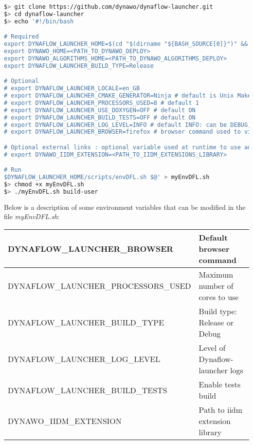 \documentclass[a4paper, 12pt]{report}
\begin{document}
\begin{lstlisting}[language=bash]
$> git clone https://github.com/dynawo/dynaflow-launcher.git
$> cd dynaflow-launcher
$> echo '#!/bin/bash

# Required
export DYNAFLOW_LAUNCHER_HOME=$(cd "$(dirname "${BASH_SOURCE[0]}")" && pwd)
export DYNAWO_HOME=<PATH_TO_DYNAWO_DEPLOY>
export DYNAWO_ALGORITHMS_HOME=<PATH_TO_DYNAWO_ALGORITHMS_DEPLOY>
export DYNAFLOW_LAUNCHER_BUILD_TYPE=Release

# Optional
# export DYNAFLOW_LAUNCHER_LOCALE=en_GB
# export DYNAFLOW_LAUNCHER_CMAKE_GENERATOR=Ninja # default is Unix Makefiles
# export DYNAFLOW_LAUNCHER_PROCESSORS_USED=8 # default 1
# export DYNAFLOW_LAUNCHER_USE_DOXYGEN=OFF # default ON
# export DYNAFLOW_LAUNCHER_BUILD_TESTS=OFF # default ON
# export DYNAFLOW_LAUNCHER_LOG_LEVEL=INFO # default INFO: can be DEBUG, INFO, WARN, ERROR
# export DYNAFLOW_LAUNCHER_BROWSER=firefox # browser command used to visualize test coverage. default: firefox

# Optional external links : optional variable used at runtime to use additional iidm extension
# export DYNAWO_IIDM_EXTENSION=<PATH_TO_IIDM_EXTENSIONS_LIBRARY>

# Run
$DYNAFLOW_LAUNCHER_HOME/scripts/envDFL.sh $@' > myEnvDFL.sh
$> chmod +x myEnvDFL.sh
$> ./myEnvDFL.sh build-user
\end{lstlisting}

Below is a description of some environment variables that can be modified in the file \textit{myEnvDFL.sh}:

\begin{center}
\begin{tabular}{|l|l|}
  \hline
   \tiny{DYNAFLOW\_LAUNCHER\_BROWSER} & \small{Default browser command} \\
  \hline
   \tiny{DYNAFLOW\_LAUNCHER\_PROCESSORS\_USED} & \small{Maximum number of cores to use} \\
  \hline
   \tiny{DYNAFLOW\_LAUNCHER\_BUILD\_TYPE} & \small{Build type: Release or Debug} \\
  \hline
   \tiny{DYNAFLOW\_LAUNCHER\_LOG\_LEVEL} & \small{Level of Dynaflow-launcher logs} \\
  \hline
   \tiny{DYNAFLOW\_LAUNCHER\_BUILD\_TESTS} & \small{Enable tests build} \\
  \hline
   \tiny{DYNAWO\_IIDM\_EXTENSION} & \small{Path to iidm extension library} \\
  \hline
\end{tabular}
\end{center}
\end{document}
